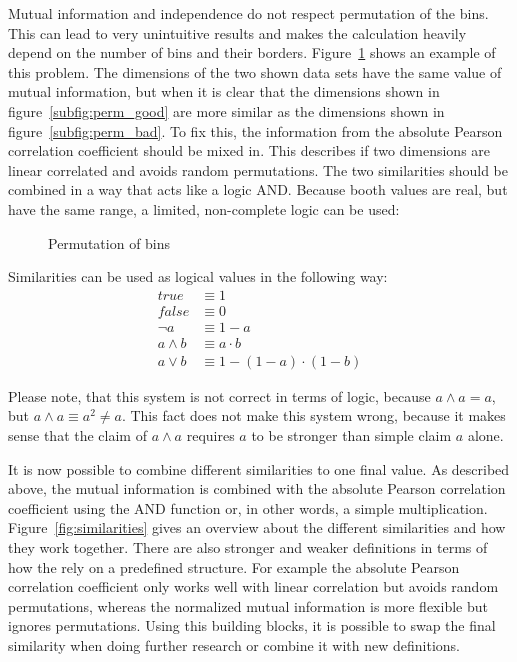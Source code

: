 Mutual information and independence do not respect permutation of the bins. This can lead to very unintuitive results and makes the calculation heavily depend on the number of bins and their borders. Figure~\ref{fig:permutation} shows an example of this problem. The dimensions of the two shown data sets have the same value of mutual information, but when it is clear that the dimensions shown in figure~\ref{subfig:perm_good} are more similar as the dimensions shown in figure~\ref{subfig:perm_bad}. To fix this, the information from the absolute Pearson correlation coefficient should be mixed in. This describes if two dimensions are linear correlated and avoids random permutations. The two similarities should be combined in a way that acts like a logic AND. Because booth values are real, but have the same range, a limited, non-complete logic can be used:

\begin{figure}
	\caption{Permutation of bins}
	\label{fig:permutation}
	\centering
	\hfill
\end{figure}

\begin{envdef}
	Similarities can be used as logical values in the following way:
	\begin{align}
		true &\equiv 1\\
		false &\equiv 0\\
		\neg a &\equiv 1 - a\\
		a \wedge b &\equiv a \cdot b\\
		a \vee b &\equiv 1 - (1 - a) \cdot (1 - b)
	\end{align}
\end{envdef}

Please note, that this system is not correct in terms of logic, because $a \wedge a = a$, but $a \wedge a \equiv a^2 \neq a$. This fact does not make this system wrong, because it makes sense that the claim of $a \wedge a$ requires $a$ to be stronger than simple claim $a$ alone.

It is now possible to combine different similarities to one final value. As described above, the mutual information is combined with the absolute Pearson correlation coefficient using the AND function or, in other words, a simple multiplication. Figure~\ref{fig:similarities} gives an overview about the different similarities and how they work together. There are also stronger and weaker definitions in terms of how the rely on a predefined structure. For example the absolute Pearson correlation coefficient only works well with linear correlation but avoids random permutations, whereas the normalized mutual information is more flexible but ignores permutations. Using this building blocks, it is possible to swap the final similarity when doing further research or combine it with new definitions.

